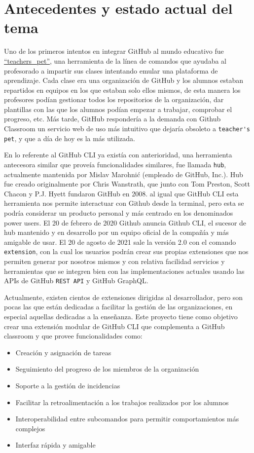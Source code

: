 \section{Antecedentes y estado actual del tema}
Uno de los primeros intentos en integrar GitHub al mundo educativo fue \href{https://github.com/education/teachers_pet}{“teachers\_pet”}, una herramienta de la línea de comandos que ayudaba al profesorado a impartir sus clases intentando emular una plataforma de aprendizaje. Cada clase era una organización de GitHub y los alumnos estaban repartidos en equipos en los que estaban solo ellos mismos, de esta manera los profesores podían gestionar todos los repositorios de la organización, dar plantillas con las que los alumnos podían empezar a trabajar, comprobar el progreso, etc.
 Más tarde, GitHub respondería a la demanda con Github Classroom  un servicio web de uso más intuitivo que dejaría obsoleto a \verb|teacher's pet|, y que a día de hoy es la más utilizada.

En lo referente al GitHub CLI ya existía con anterioridad, una herramienta antecesora similar que proveía funcionalidades similares, fue  llamada \verb|hub|, actualmente mantenida por Mislav Marohnić (empleado de GitHub, Inc.). Hub fue creado originalmente por Chris Wanstrath, que junto con Tom Preston, Scott Chacon y P.J. Hyett fundaron GitHub en 2008. al igual que GitHub CLI esta herramienta nos permite interactuar con Github desde la terminal, pero esta se podría considerar un producto personal y más centrado en los denominados \gls{power users}. El 20 de febrero de 2020 Github anuncia Github CLI, el sucesor de hub mantenido y en desarrollo por un equipo oficial de la compañía y más amigable de usar. El 20 de agosto de 2021 sale la versión 2.0 con el comando \verb|extension|\cite{gh-extension}, con la cual los usuarios podrán crear sus propias extensiones que nos permiten generar por nosotros mismos y con relativa facilidad servicios y herramientas que se integren bien con las implementaciones actuales usando  las \gls{API}s de GitHub \verb|REST API|\cite{github-rest-api} y GitHub GraphQL\cite{github-graphql}.

Actualmente, existen cientos de extensiones dirigidas al desarrollador, pero son pocas las que están dedicadas a facilitar la gestión de las organizaciones, en especial aquellas dedicadas a la enseñanza. Este proyecto tiene como objetivo crear una extensión modular de GitHub CLI que complementa a GitHub classroom y que provee funcionalidades como:

\begin{itemize}
    \item Creación y asignación de tareas
    \item Seguimiento del progreso de los miembros de la organización
    \item Soporte a la gestión de incidencias
    \item Facilitar la retroalimentación a los trabajos realizados por los alumnos
    \item Interoperabilidad entre subcomandos para permitir comportamientos más complejos
    \item Interfaz rápida y amigable
\end{itemize}